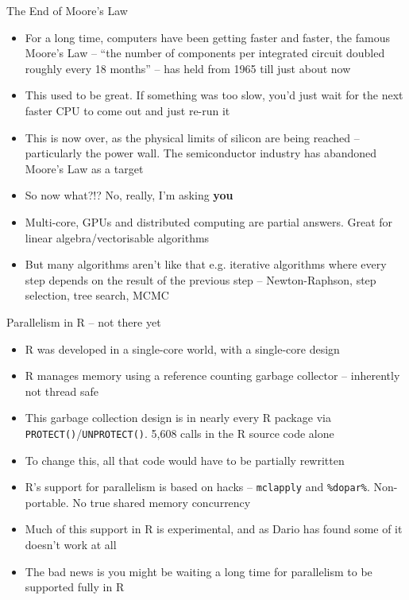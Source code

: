 \documentclass{beamer}
\begin{document}
\begin{frame}{The End of Moore's Law}
\begin{itemize}
\item For a long time, computers have been getting faster and faster, the famous
			Moore's Law -- ``the number of components per integrated circuit doubled roughly every 18 months'' -- 
			has held from 1965 till just about now
\item This used to be great. If something was too slow, you'd just wait for the next faster CPU to come out
			and just re-run it
\item This is now over, as the physical limits of silicon are being reached -- particularly the power wall. 
			The semiconductor industry has abandoned Moore's Law as a target
\item So now what?!? No, really, I'm asking \textbf{you}
\item Multi-core, GPUs and distributed computing are partial answers. Great for
			linear algebra/vectorisable algorithms
\item But many algorithms aren't like that e.g. iterative algorithms where every step depends on the 
			result of the previous step -- Newton-Raphson, step selection, tree search, MCMC
\end{itemize}
\end{frame}

\begin{frame}{Parallelism in R -- not there yet}
\begin{itemize}
\item R was developed in a single-core world, with a single-core design
\item R manages memory using a reference counting garbage collector -- inherently
			not thread safe
\item This garbage collection design is in nearly every R package via
			\texttt{PROTECT()}/\texttt{UNPROTECT()}. 5,608 calls in the R source code alone
\item To change this, all that code would have to be partially rewritten
\item R's support for parallelism is based on hacks -- \texttt{mclapply} and \texttt{\%dopar\%}.
			Non-portable. No true shared memory concurrency
\item Much of this support in R is experimental, and as Dario has found some of it doesn't work at all
\item The bad news is you might be waiting a long time for parallelism to be supported fully in R
\end{itemize}
\end{frame}
\end{document}
